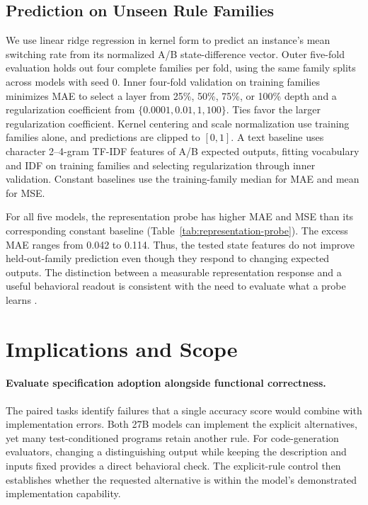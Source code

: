\documentclass[acmsmall,screen,review,anonymous]{acmart}
\begin{document}
\subsection{Prediction on Unseen Rule Families}
We use linear ridge regression in kernel form to predict an instance's mean switching rate from its normalized A/B state-difference vector.
Outer five-fold evaluation holds out four complete families per fold, using the same family splits across models with seed 0.
Inner four-fold validation on training families minimizes MAE to select a layer from 25\%, 50\%, 75\%, or 100\% depth and a regularization coefficient from $\{0.0001,0.01,1,100\}$.
Ties favor the larger regularization coefficient.
Kernel centering and scale normalization use training families alone, and predictions are clipped to $[0,1]$.
A text baseline uses character 2--4-gram TF-IDF features of A/B expected outputs, fitting vocabulary and IDF on training families and selecting regularization through inner validation.
Constant baselines use the training-family median for MAE and mean for MSE.



For all five models, the representation probe has higher MAE and MSE than its corresponding constant baseline (Table~\ref{tab:representation-probe}).
The excess MAE ranges from 0.042 to 0.114.
Thus, the tested state features do not improve held-out-family prediction even though they respond to changing expected outputs.
The distinction between a measurable representation response and a useful behavioral readout is consistent with the need to evaluate what a probe learns \citep{hewitt2019probes}.

\section{Implications and Scope}

\paragraph{Evaluate specification adoption alongside functional correctness.}
The paired tasks identify failures that a single accuracy score would combine with implementation errors.
Both 27B models can implement the explicit alternatives, yet many test-conditioned programs retain another rule.
For code-generation evaluators, changing a distinguishing output while keeping the description and inputs fixed provides a direct behavioral check.
The explicit-rule control then establishes whether the requested alternative is within the model's demonstrated implementation capability.
\end{document}
